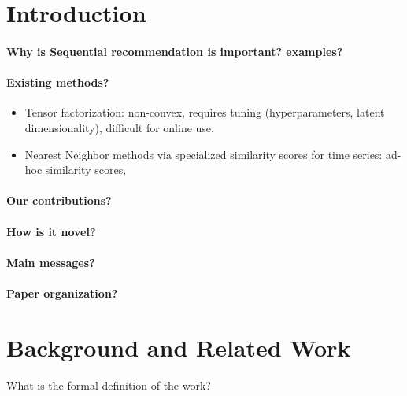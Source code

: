 \documentclass{sig-alternate-05-2015}
\begin{document}
%
%

%
%
\printccsdesc



\section{Introduction}
\paragraph{Why is Sequential recommendation is important? examples?}


\paragraph{Existing methods?} 
\begin{itemize}
\item Tensor factorization: non-convex, requires tuning (hyperparameters, latent dimensionality), difficult for online use.
\item Nearest Neighbor methods via specialized similarity scores for time series: ad-hoc similarity scores, 
\end{itemize}

\paragraph{Our contributions?}


\paragraph{How is it novel?} 

\paragraph{Main messages?}

\paragraph{Paper organization?}


\section{Background and Related Work}
What is the formal definition of the work?
\end{document}
